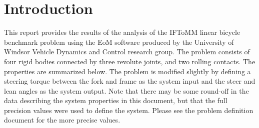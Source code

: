 \chapter{Introduction}
This report provides the results of the analysis of the IFToMM linear bicycle benchmark problem using the EoM software produced by the University of Windsor Vehicle Dynamics and Control research group.  The problem consists of four rigid bodies connected by three revolute joints, and two rolling contacts.  The properties are summarized below.  The problem is modified slightly by defining a steering torque between the fork and frame as the system input and the steer and lean angles as the system output.  Note that there may be some round-off in the data describing the system properties in this document, but that the full precision values were used to define the system.  Please see the problem definition document for the more precise values.

